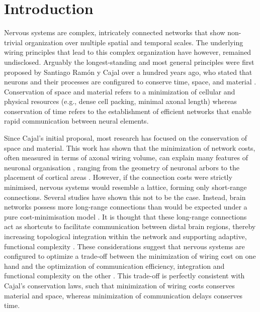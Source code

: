 \section{Introduction}

Nervous systems are complex, intricately connected networks that show non-trivial organization over multiple spatial and temporal scales. The underlying wiring principles that lead to this complex organization have however, remained undisclosed. Arguably the longest-standing and most general principles were first proposed by Santiago Ramón y Cajal over a hundred years ago, who stated that neurons and their processes are configured to conserve time, space, and material \citep{RamonyCajal1995}. Conservation of space and material refers to a minimization of cellular and physical resources (e.g., dense cell packing, minimal axonal length) whereas conservation of time refers to the establishment of efficient networks that enable rapid communication between neural elements. 

Since Cajal’s initial proposal, most research has focused on the conservation of space and material. This work has shown that the minimization of network costs, often measured in terms of axonal wiring volume, can explain many features of neuronal organisation \citep{Cherniak1994,Chklovskii2002,Klyachko2003,Rivera-Alba2011,Wen2005}, ranging from the geometry of neuronal arbors \citep{Cherniak1999} to the placement of cortical areas \citep{Cherniak2004}. However, if the connection costs were strictly minimised, nervous systems would resemble a lattice, forming only short-range connections. Several studies have shown this not to be the case. Instead, brain networks possess more long-range connections than would be expected under a pure cost-minimisation model \citep{Bassett2006,Bullmore2012,Kaiser2006}. It is thought that these long-range connections act as shortcuts to facilitate communication between distal brain regions, thereby increasing topological integration within the network \citep{Bullmore2012,Buzsaki2004a,VandenHeuvel2012} and supporting adaptive, functional complexity \citep{Betzel2018}. These considerations suggest that nervous systems are configured to optimize a trade-off between the minimization of wiring cost on one hand and the optimization of communication efficiency, integration and functional complexity on the other \citep{Bullmore2012}. This trade-off is perfectly consistent with Cajal’s conservation laws, such that minimization of wiring costs conserves material and space, whereas minimization of communication delays conserves time. 


